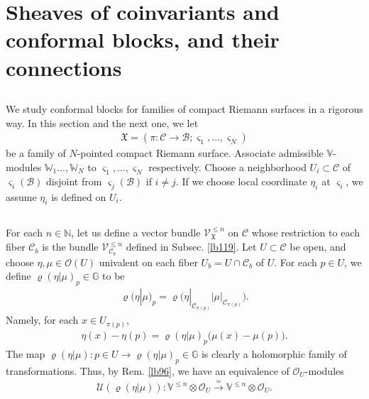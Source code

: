 \documentclass[11pt,b5paper,notitlepage]{article}
\theoremstyle{definition}
\theoremstyle{plain}
\newcommand{\fk}{\mathfrak}
\newcommand{\mc}{\mathcal}
\newcommand{\id}{\mathbf{1}}
\newcommand{\scr}{\mathscr}
\newcommand{\sgm}{\varsigma}
\newcommand{\Vbb}{\mathbb V}
\newcommand{\Wbb}{\mathbb W}
\newcommand{\Gbb}{\mathbb G}
\newcommand{\Nbb}{\mathbb N}
\numberwithin{equation}{section}
\begin{document}
\section{Sheaves of coinvariants and conformal blocks, and their connections}\label{lb136}



\subsection{}\label{lb127}

We study conformal blocks for families of compact Riemann surfaces in a rigorous way. In this section and the next one, we let
\begin{align*}
\fk X=(\pi:\mc C\rightarrow\mc B;\sgm_1,\dots,\sgm_N)
\end{align*}
be a family of $N$-pointed compact Riemann surface. Associate admissible $\Vbb$-modules $\Wbb_1\dots,\Wbb_N$ to $\sgm_1,\dots,\sgm_N$ respectively. Choose a  neighborhood $U_i\subset\mc C$ of $\sgm_i(\mc B)$ disjoint from $\sgm_j(\mc B)$ if $i\neq j$. If we choose local coordinate $\eta_i$ at $\sgm_i$, we assume $\eta_i$ is defined on $U_i$. 


\subsection{}

For each $n\in\Nbb$, let us define a vector bundle $\scr V^{\leq n}_{\fk X}$ on $\mc C$ whose restriction to each fiber $\mc C_b$ is the bundle $\scr V^{\leq n}_{\mc C_b}$ defined in Subsec. \ref{lb119}. Let $U\subset\mc C$ be open, and choose $\eta,\mu\in\scr O(U)$ univalent on each fiber $U_b=U\cap\mc C_b$ of $U$. For each $p\in U$, we define $\varrho(\eta|\mu)_p\in\Gbb$ to be
\begin{align}
\varrho(\eta|\mu)_p=\varrho\Big(\eta|_{\mc C_{\pi(p)}}\Big|\mu|_{\mc C_{\pi(p)}}\Big).
\end{align}
Namely, for each $x\in U_{\pi(p)}$, \index{zz@$\varrho(\alpha\lvert\id),\varrho(\eta\lvert\mu)$}
\begin{align}
\eta(x)-\eta(p)=\varrho(\eta|\mu)_p\big(\mu(x)-\mu(p)\big).
\end{align}
The map $\varrho(\eta|\mu):p\in U\rightarrow\varrho(\eta|\mu)_p\in\Gbb$ is clearly a holomorphic family of transformations. Thus, by Rem. \ref{lb96}, we have an equivalence of $\scr O_U$-modules
\begin{align}
\mc U(\varrho(\eta|\mu)):\Vbb^{\leq n}\otimes\scr O_U\xrightarrow{\simeq}\Vbb^{\leq n}\otimes\scr O_U.
\end{align}
\end{document}
